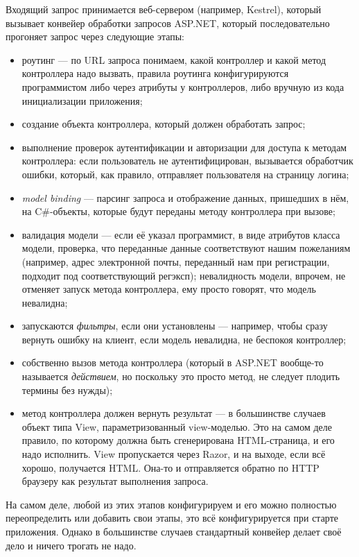 \documentclass[a5paper]{article}
\begin{document}
Входящий запрос принимается веб-сервером (например, Kestrel), который вызывает конвейер обработки запросов ASP.NET, который последовательно прогоняет запрос через следующие этапы:

\begin{itemize}
    \item роутинг --- по URL запроса понимаем, какой контроллер и какой метод контроллера надо вызвать, правила роутинга конфигурируются программистом либо через атрибуты у контроллеров, либо вручную из кода инициализации приложения;
    \item создание объекта контроллера, который должен обработать запрос;
    \item выполнение проверок аутентификации и авторизации для доступа к методам контроллера: если пользователь не аутентифицирован, вызывается обработчик ошибки, который, как правило, отправляет пользователя на страницу логина;
    \item \emph{model binding} --- парсинг запроса и отображение данных, пришедших в нём, на C\#-объекты, которые будут переданы методу контроллера при вызове;
    \item валидация модели --- если её указал программист, в виде атрибутов класса модели, проверка, что переданные данные соответствуют нашим пожеланиям (например, адрес электронной почты, переданный нам при регистрации, подходит под соответствующий регэксп); невалидность модели, впрочем, не отменяет запуск метода контроллера, ему просто говорят, что модель невалидна;
    \item запускаются \emph{фильтры}, если они установлены --- например, чтобы сразу вернуть ошибку на клиент, если модель невалидна, не беспокоя контроллер;
    \item собственно вызов метода контроллера (который в ASP.NET вообще-то называется \emph{действием}, но поскольку это просто метод, не следует плодить термины без нужды);
    \item метод контроллера должен вернуть результат --- в большинстве случаев объект типа View, параметризованный view-моделью. Это на самом деле правило, по которому должна быть сгенерирована HTML-страница, и его надо исполнить. View пропускается через Razor, и на выходе, если всё хорошо, получается HTML. Она-то и отправляется обратно по HTTP браузеру как результат выполнения запроса.
\end{itemize}

На самом деле, любой из этих этапов конфигурируем и его можно полностью переопределить или добавить свои этапы, это всё конфигурируется при старте приложения. Однако в большинстве случаев стандартный конвейер делает своё дело и ничего трогать не надо.
\end{document}
